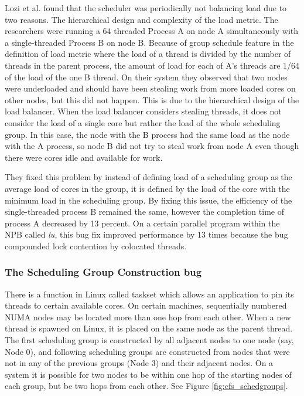 \documentclass{sig-alternate}
\begin{document}
Lozi et al. found that the scheduler was periodically not balancing load due to two reasons. The hierarchical design and complexity of the load metric. The researchers were running a 64 threaded Process A on node A simultaneously with a single-threaded Process B on node B. Because of group schedule feature in the definition of load metric where the load of a thread is divided by the number of threads in the parent process, the amount of load for each of A's threads are 1/64 of the load of the one B thread. On their system they observed that two nodes were underloaded and should have been stealing work from more loaded cores on other nodes, but this did not happen. This is due to the hierarchical design of the load balancer. When the load balancer considers stealing threads, it does not consider the load of a single core but rather the load of the whole scheduling group. In this case, the node with the B process had the same load as the node with the A process, so node B did not try to steal work from node A even though there were cores idle and available for work.~\cite{Lozi:2016}

They fixed this problem by instead of defining load of a scheduling group as the average load of cores in the group, it is defined by the load of the core with the minimum load in the scheduling group. By fixing this issue, the efficiency of the single-threaded process B remained the same, however the completion time of process A decreased by 13 percent. On a certain parallel program within the NPB called \textit{lu}, this bug fix improved performance by 13 times because the bug compounded lock contention by colocated threads.~\cite{Lozi:2016}

\subsubsection{The Scheduling Group Construction bug}
\label{sec:cfsfault_grpconstruct}

There is a function in Linux called taskset which allows an application to pin its threads to certain available cores. On certain machines, sequentially numbered NUMA nodes may be located more than one hop from each other. When a new thread is spawned on Linux, it is placed on the same node as the parent thread. The first scheduling group is constructed by all adjacent nodes to one node (say, Node 0), and following scheduling groups are constructed from nodes that were not in any of the previous groups (Node 3) and their adjacent nodes. On a system it is possible for two nodes to be within one hop of the starting nodes of each group, but be two hops from each other. See Figure \ref{fig:cfs_schedgroups}.~\cite{Lozi:2016}
\end{document}
